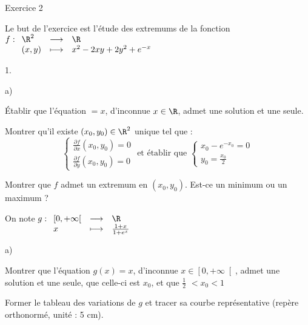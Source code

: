 \documentclass[11pt]{article}%
\begin{document}
\begin{center}
{\LARGE Exercice 2}
\end{center}

Le but de l'exercice est l'étude des extremums de la fonction $f : 
\begin{array}[t]{lll}
\R^{2} & \longrightarrow & \R \\
\left( x,y\right) & \longmapsto & x^{2}-2xy + 2y^{2} + e^{-x}
\end{array}
$

\begin{noliste}{1.}
 \setlength{\itemsep}{4mm}
\item 
\begin{noliste}{a)}
 \setlength{\itemsep}{2mm}
\item Établir que l'équation $ = x$, d'inconnue $x\in \R$, admet une
solution et une seule.

\item Montrer qu'il existe $\left( x_{0},y_{0}\right) \in \R^{2}$
unique tel que : 
\[
\left\{ 
\begin{array}{c}
 \frac{\partial f}{\partial x}\left( x_{0},y_{0}\right)
 = 0\\
 \frac{\partial f}{\partial y}\left( x_{0},y_{0}\right) = 0
\end{array}
\right. \text{ et établir que }\left\{ 
\begin{array}{c}
 x_{0}-e^{-x_{0}} = 0 \\
 y_{0} = \frac{x_{0}}{2}
\end{array}
\right. 
\]

\item Montrer que $f$ admet un extremum en $\left( x_{0},y_{0}\right)
$.
Est-ce un minimum ou un maximum ?
\end{noliste}

\item On note $g : 
\begin{array}[t]{lll}
\left[ 0, + \infty \right[ & \longrightarrow & \R \\
x & \longmapsto &  \frac{1 + x}{1 + e^{x}}
\end{array}
$

\begin{noliste}{a)}
 \setlength{\itemsep}{2mm}
\item Montrer que l'équation $g(x) = x$, d'inconnue $x\in \left[ 0, +
\infty \right[ $, admet une solution et une seule, que celle-ci est
$x_{0} $, et
que $\frac{1}{2}$ $<x_{0}<1$

\item Former le tableau des variations de $g$ et tracer sa courbe
représentative (repère orthonormé, unité : 5 cm).


\end{noliste}
\end{noliste}
\end{document}
